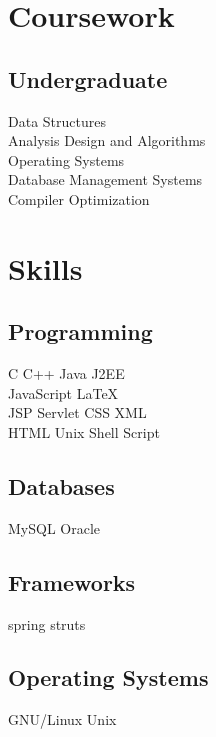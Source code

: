 \documentclass[]{prashant-resume-openfont}
\begin{document}
\begin{minipage}[t]{0.33\textwidth}

\section{Coursework}
\subsection{Undergraduate}
Data Structures \\
Analysis Design and Algorithms \\
Operating Systems \\
Database Management Systems \\
Compiler Optimization \\
\sectionsep


\section{Skills}
\subsection{Programming}
C \textbullet{}   C++ \textbullet{} Java \textbullet{} J2EE \\
JavaScript \textbullet{} \LaTeX\ \\ 
JSP \textbullet{} Servlet \textbullet{} CSS \textbullet{} XML\\
HTML \textbullet{} Unix \textbullet{} Shell Script \\
\sectionsep
\subsection{Databases}
MySQL \textbullet{}   Oracle \\
\sectionsep 

\subsection{Frameworks}
spring \textbullet{} struts
\sectionsep
\subsection{Operating Systems}
GNU/Linux \textbullet{}   Unix 
\sectionsep


\end{minipage}
\end{document}
